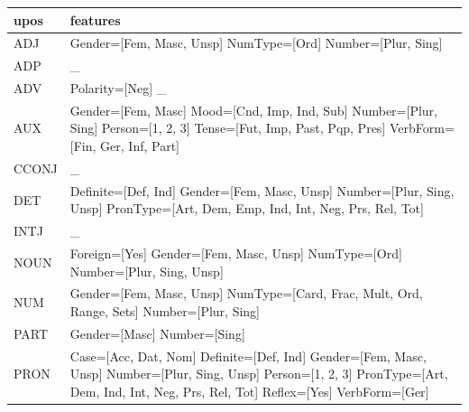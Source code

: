 \documentclass[output=paper,colorlinks,citecolor=brown]{langscibook}
\begin{document}
	\begin{longtable}{ p{1.5cm} | p{10cm} }
	
		\textbf{upos} & \textbf{features} \\\hline
		ADJ & Gender=[Fem, Masc, Unsp] \newline NumType=[Ord] \newline Number=[Plur, Sing] \newline \\
		ADP & \_ \newline\\
		ADV & Polarity=[Neg] \newline \_ \newline \\
		AUX & Gender=[Fem, Masc] \newline Mood=[Cnd, Imp, Ind, Sub] \newline Number=[Plur, Sing] \newline Person=[1, 2, 3] \newline Tense=[Fut, Imp, Past, Pqp, Pres] \newline VerbForm=[Fin, Ger, Inf, Part] \newline \\
		CCONJ & \_ \newline\\
		DET & Definite=[Def, Ind] \newline Gender=[Fem, Masc, Unsp] \newline Number=[Plur, Sing, Unsp] \newline PronType=[Art, Dem, Emp, Ind, Int, Neg, Prs, Rel, Tot] \newline \\
		INTJ & \_ \newline\\
		NOUN & Foreign=[Yes] \newline Gender=[Fem, Masc, Unsp] \newline NumType=[Ord] \newline Number=[Plur, Sing, Unsp] \newline \\
		NUM & Gender=[Fem, Masc, Unsp] \newline NumType=[Card, Frac, Mult, Ord, Range, Sets] \newline Number=[Plur, Sing] \newline \\
		PART & Gender=[Masc] \newline Number=[Sing] \newline \\
		PRON & Case=[Acc, Dat, Nom] \newline Definite=[Def, Ind] \newline Gender=[Fem, Masc, Unsp] \newline Number=[Plur, Sing, Unsp] \newline Person=[1, 2, 3] \newline PronType=[Art, Dem, Ind, Int, Neg, Prs, Rel, Tot] \newline Reflex=[Yes] \newline VerbForm=[Ger] \newline \\

\end{longtable}
\end{document}
